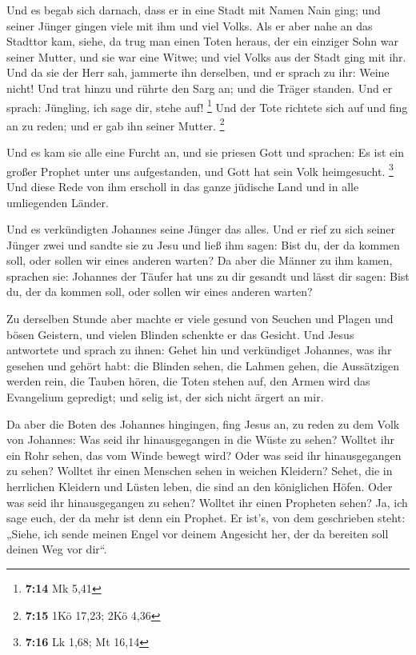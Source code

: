  Und es begab sich darnach, dass er in eine Stadt mit Namen
Nain ging; und seiner Jünger gingen viele mit ihm und viel Volks.
 Als er aber nahe an das Stadttor kam, siehe, da trug man
einen Toten heraus, der ein einziger Sohn war seiner Mutter, und sie war
eine Witwe; und viel Volks aus der Stadt ging mit ihr.  Und
da sie der Herr sah, jammerte ihn derselben, und er sprach zu ihr: Weine
nicht!  Und trat hinzu und rührte den Sarg an; und die
Träger standen. Und er sprach: Jüngling, ich sage dir, stehe auf!
\footnote{\textbf{7:14} Mk 5,41}  Und der Tote richtete
sich auf und fing an zu reden; und er gab ihn seiner Mutter. \footnote{\textbf{7:15}
  1Kö 17,23; 2Kö 4,36}

 Und es kam sie alle eine Furcht an, und sie priesen Gott
und sprachen: Es ist ein großer Prophet unter uns aufgestanden, und Gott
hat sein Volk heimgesucht. \footnote{\textbf{7:16} Lk 1,68; Mt 16,14}
 Und diese Rede von ihm erscholl in das ganze jüdische Land
und in alle umliegenden Länder.

 Und es verkündigten Johannes seine Jünger das alles. Und
er rief zu sich seiner Jünger zwei  und sandte sie zu Jesu
und ließ ihm sagen: Bist du, der da kommen soll, oder sollen wir eines
anderen warten?  Da aber die Männer zu ihm kamen, sprachen
sie: Johannes der Täufer hat uns zu dir gesandt und lässt dir sagen:
Bist du, der da kommen soll, oder sollen wir eines anderen warten?

 Zu derselben Stunde aber machte er viele gesund von
Seuchen und Plagen und bösen Geistern, und vielen Blinden schenkte er
das Gesicht.  Und Jesus antwortete und sprach zu ihnen:
Gehet hin und verkündiget Johannes, was ihr gesehen und gehört habt: die
Blinden sehen, die Lahmen gehen, die Aussätzigen werden rein, die Tauben
hören, die Toten stehen auf, den Armen wird das Evangelium gepredigt;
 und selig ist, der sich nicht ärgert an mir.

 Da aber die Boten des Johannes hingingen, fing Jesus an,
zu reden zu dem Volk von Johannes: Was seid ihr hinausgegangen in die
Wüste zu sehen? Wolltet ihr ein Rohr sehen, das vom Winde bewegt wird?
 Oder was seid ihr hinausgegangen zu sehen? Wolltet ihr
einen Menschen sehen in weichen Kleidern? Sehet, die in herrlichen
Kleidern und Lüsten leben, die sind an den königlichen Höfen.
 Oder was seid ihr hinausgegangen zu sehen? Wolltet ihr
einen Propheten sehen? Ja, ich sage euch, der da mehr ist denn ein
Prophet.  Er ist's, von dem geschrieben steht: „Siehe, ich
sende meinen Engel vor deinem Angesicht her, der da bereiten soll deinen
Weg vor dir``.

